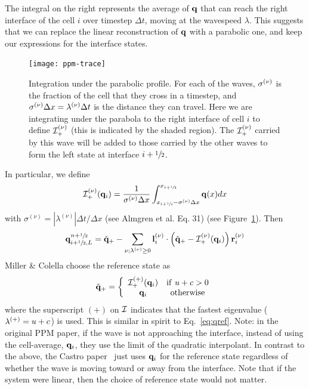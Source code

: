 \noindent The integral on the right represents the average of ${\bf q}$ that
can reach the right interface of the cell $i$ over timestep $\Delta
t$, moving at the wavespeed $\lambda$.  This suggests that we can
replace the linear reconstruction of ${\bf q}$ with a parabolic one, and
keep our expressions for the interface states.

\begin{figure}
\centering
\texttt{[image: ppm-trace]}
\caption[Integration under the parabola profile for to an
  interface]{\label{fig:ppm_trace} Integration under the parabolic
  profile.  For each of the waves, $\sigma^{(\nu)}$ is the fraction of
  the cell that they cross in a timestep, and $\sigma^{(\nu)} \Delta x =
  \lambda^{(\nu)} \Delta t$ is the distance they can travel.  Here we are
  integrating under the parabola to the right interface of cell $i$ to
  define ${\mathcal{I}}_+^{(\nu)}$ (this is indicated by the shaded
  region).  The ${\mathcal{I}}_+^{(\nu)}$ carried by this wave will be
  added to those carried by the other waves to form the left state at
  interface $i+{\sfrac{1}{2}}$.}
\end{figure}

In particular, we define
\begin{equation}
{\mathcal{I}}_+^{(\nu)}({\bf q}_i) = \frac{1}{\sigma^{(\nu)} \Delta x} \int _{x_{i+{\sfrac{1}{2}}} - \sigma^{(\nu)} \Delta x}^{x_{i+{\sfrac{1}{2}}}} {\bf q}(x) dx
\end{equation}
with $\sigma^{(\nu)} = |\lambda^{(\nu)}|\Delta t / \Delta x$ (see Almgren et
al. Eq. 31)  (see Figure~\ref{fig:ppm_trace}).  Then
\begin{equation}
{\bf q}_{i+{\sfrac{1}{2}},L}^{n+{\sfrac{1}{2}}} = \tilde{{\bf q}}_+ -
   \sum_{\nu;\lambda^{(\nu)}\ge 0} {\bf l}_i^{(\nu)} \cdot \left (
        \tilde{{\bf q}}_+ - {\mathcal{I}}_+^{(\nu)}({\bf q}_i)
       \right ) {\bf r}_i^{(\nu)}  \label{eq:ppmtrace}
\end{equation}
Miller \& Colella choose the reference state as
\begin{equation}
\tilde{{\bf q}}_+ = \left \{ \begin{array}{cc}
       {\mathcal{I}}_+^{(+)}({\bf q}_i) & \mathrm{if~} u + c > 0 \\
       {\bf q}_i                    & \mathrm{otherwise}
\end{array}
\right .
\end{equation}
where the superscript $(+)$ on ${\mathcal{I}}$ indicates that the
fastest eigenvalue ($\lambda^{(+)} = u + c$) is used.  This is similar in
spirit to Eq.~\ref{eq:qref}.  Note: in the original PPM paper, if the
wave is not approaching the interface, instead of using the
cell-average, ${\bf q}_i$, they use the limit of the quadratic interpolant.
In contrast to the above, the Castro paper~\cite{almgren:2010} just
uses ${\bf q}_i$ for the reference state regardless of whether the wave is
moving toward or away from the interface.  Note that if the system
were linear, then the choice of reference state would not matter.

